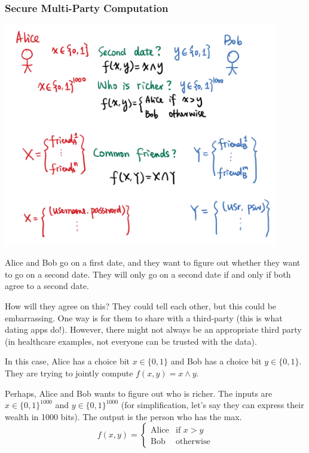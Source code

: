 \subsubsection{Secure Multi-Party Computation}
\begin{center}
    \includegraphics[width=0.9\textwidth]{images/2023-01-26/secure_mpc.png}
\end{center}

\begin{example*}
    Alice and Bob go on a first date, and they want to figure out whether they want to go on a second date. They will only go on a second date if and only if both agree to a second date.

    How will they agree on this? They could tell each other, but this could be embarrassing. One way is for them to share with a third-party (this is what dating apps do!). However, there might not always be an appropriate third party (in healthcare examples, not everyone can be trusted with the data).

    In this case, Alice has a choice bit $x\in\{0, 1\}$ and Bob has a choice bit $y\in\{0, 1\}$. They are trying to jointly compute $f(x, y) = x\land y$.
\end{example*}

\begin{example*}
    Perhaps, Alice and Bob wants to figure out who is richer. The inputs are $x\in\{0, 1\}^{1000}$ and $y\in\{0, 1\}^{1000}$ (for simplification, let's say they can express their wealth in 1000 bits). The output is the person who has the max.
    \[f(x, y) = \begin{cases}
            \text{Alice} & \text{if }x > y  \\
            \text{Bob}   & \text{otherwise}
        \end{cases}\]
\end{example*}

